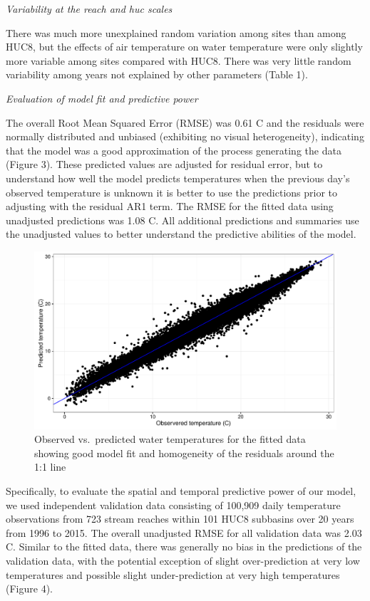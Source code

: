 \documentclass[]{article}
\begin{document}
\emph{Variability at the reach and huc scales}

There was much more unexplained random variation among sites than among
HUC8, but the effects of air temperature on water temperature were only
slightly more variable among sites compared with HUC8. There was very
little random variability among years not explained by other parameters
(Table 1).

\emph{Evaluation of model fit and predictive power}

The overall Root Mean Squared Error (RMSE) was 0.61 C and the residuals
were normally distributed and unbiased (exhibiting no visual
heterogeneity), indicating that the model was a good approximation of
the process generating the data (Figure 3). These predicted values are
adjusted for residual error, but to understand how well the model
predicts temperatures when the previous day's observed temperature is
unknown it is better to use the predictions prior to adjusting with the
residual AR1 term. The RMSE for the fitted data using unadjusted
predictions was 1.08 C. All additional predictions and summaries use the
unadjusted values to better understand the predictive abilities of the
model.

\begin{figure}[htbp]
\centering
\includegraphics{manuscripts/Figures/Obs_Fitted.pdf}
\caption{Observed vs.~predicted water temperatures for the fitted data
showing good model fit and homogeneity of the residuals around the 1:1
line}
\end{figure}

Specifically, to evaluate the spatial and temporal predictive power of
our model, we used independent validation data consisting of 100,909
daily temperature observations from 723 stream reaches within 101 HUC8
subbasins over 20 years from 1996 to 2015. The overall unadjusted RMSE
for all validation data was 2.03 C. Similar to the fitted data, there
was generally no bias in the predictions of the validation data, with
the potential exception of slight over-prediction at very low
temperatures and possible slight under-prediction at very high
temperatures (Figure 4).
\end{document}
